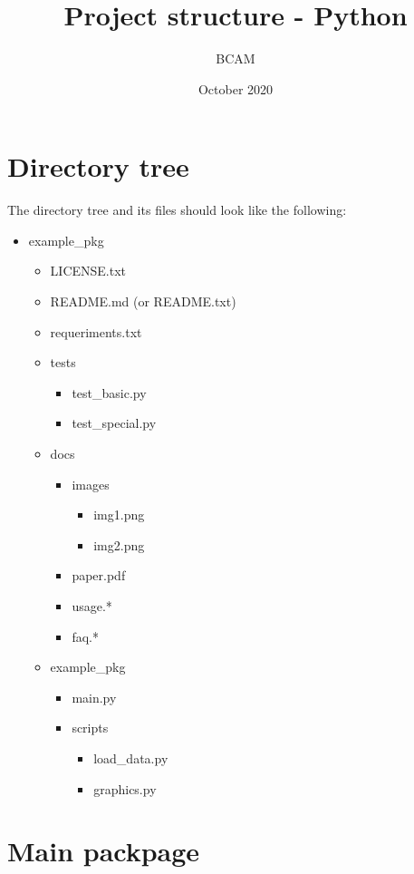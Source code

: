 \documentclass[a4paper]{article}
\title{Project structure - Python}
\date{October  2020}
\author{BCAM}
\begin{document}
	\maketitle
	\tableofcontents
	\section{Directory tree}
		The directory tree and its files should look like the following:\\
		\begin{itemize}
			\item example\_pkg
			\begin{itemize}
				\item LICENSE.txt
				\item README.md (or README.txt)
				\item requeriments.txt
				\item tests
				\begin{itemize}
					\item test\_basic.py
					\item test\_special.py
				\end{itemize}
				\item docs
				\begin{itemize}
					\item images
					\begin{itemize}
						\item img1.png
						\item img2.png
					\end{itemize}
					\item paper.pdf
					\item usage.*
					\item faq.*
				\end{itemize}
				\item example\_pkg
				\begin{itemize}
					\item main.py
					\item scripts
					\begin{itemize}
						\item load\_data.py
						\item graphics.py
					\end{itemize} 
				\end{itemize}
				
			\end{itemize}
		\end{itemize}
	\section{Main packpage}
\end{document}
